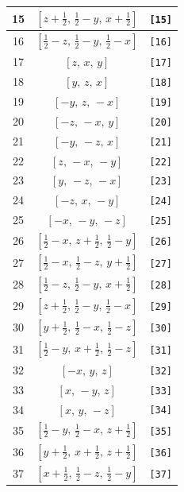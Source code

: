 \documentclass[fleqn,8pt]{jsarticle}
\begin{document}
\begin{longtable}{ccc}
15 & $\left[ z + \frac{1}{2},\, \frac{1}{2} - y,\, x + \frac{1}{2} \right]$ & {\tt [15]} \\ \hline
16 & $\left[ \frac{1}{2} - z,\, \frac{1}{2} - y,\, \frac{1}{2} - x \right]$ & {\tt [16]} \\ \hline
17 & $\left[ z,\, x,\, y \right]$ & {\tt [17]} \\ \hline
18 & $\left[ y,\, z,\, x \right]$ & {\tt [18]} \\ \hline
19 & $\left[ - y,\, z,\, - x \right]$ & {\tt [19]} \\ \hline
20 & $\left[ - z,\, - x,\, y \right]$ & {\tt [20]} \\ \hline
21 & $\left[ - y,\, - z,\, x \right]$ & {\tt [21]} \\ \hline
22 & $\left[ z,\, - x,\, - y \right]$ & {\tt [22]} \\ \hline
23 & $\left[ y,\, - z,\, - x \right]$ & {\tt [23]} \\ \hline
24 & $\left[ - z,\, x,\, - y \right]$ & {\tt [24]} \\ \hline
25 & $\left[ - x,\, - y,\, - z \right]$ & {\tt [25]} \\ \hline
26 & $\left[ \frac{1}{2} - x,\, z + \frac{1}{2},\, \frac{1}{2} - y \right]$ & {\tt [26]} \\ \hline
27 & $\left[ \frac{1}{2} - x,\, \frac{1}{2} - z,\, y + \frac{1}{2} \right]$ & {\tt [27]} \\ \hline
28 & $\left[ \frac{1}{2} - z,\, \frac{1}{2} - y,\, x + \frac{1}{2} \right]$ & {\tt [28]} \\ \hline
29 & $\left[ z + \frac{1}{2},\, \frac{1}{2} - y,\, \frac{1}{2} - x \right]$ & {\tt [29]} \\ \hline
30 & $\left[ y + \frac{1}{2},\, \frac{1}{2} - x,\, \frac{1}{2} - z \right]$ & {\tt [30]} \\ \hline
31 & $\left[ \frac{1}{2} - y,\, x + \frac{1}{2},\, \frac{1}{2} - z \right]$ & {\tt [31]} \\ \hline
32 & $\left[ - x,\, y,\, z \right]$ & {\tt [32]} \\ \hline
33 & $\left[ x,\, - y,\, z \right]$ & {\tt [33]} \\ \hline
34 & $\left[ x,\, y,\, - z \right]$ & {\tt [34]} \\ \hline
35 & $\left[ \frac{1}{2} - y,\, \frac{1}{2} - x,\, z + \frac{1}{2} \right]$ & {\tt [35]} \\ \hline
36 & $\left[ y + \frac{1}{2},\, x + \frac{1}{2},\, z + \frac{1}{2} \right]$ & {\tt [36]} \\ \hline
37 & $\left[ x + \frac{1}{2},\, \frac{1}{2} - z,\, \frac{1}{2} - y \right]$ & {\tt [37]} \\ \hline

\end{longtable}
\end{document}
